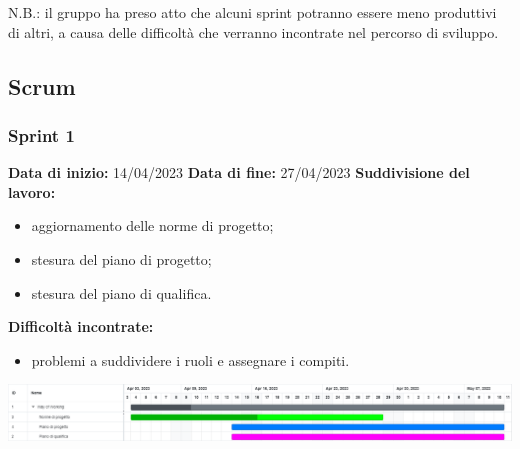 \documentclass[a4paper, 12pt]{article}
\begin{document}
N.B.: il gruppo ha preso atto che alcuni sprint potranno essere meno produttivi di altri, a causa delle difficoltà che verranno incontrate nel percorso di sviluppo.


\newpage

\subsection{Scrum}\label{Scrum}

\subsubsection{Sprint 1}
\textbf{Data di inizio:} 14/04/2023\newline
\textbf{Data di fine:} 27/04/2023\newline
\newline
\textbf{Suddivisione del lavoro:}
\begin{itemize}
	\item aggiornamento delle norme di progetto;
	\item stesura del piano di progetto;
	\item stesura del piano di qualifica.
\end{itemize}
\textbf{Difficoltà incontrate:}
\begin{itemize}
	\item problemi a suddividere i ruoli e assegnare i compiti.
\end{itemize}
\includegraphics[scale=0.24]{WoW_1.png}\newline
\newline
\end{document}
